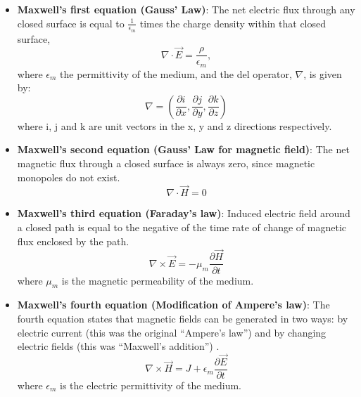 \documentclass[../report.tex]{subfiles}
\begin{document}
\begin{itemize}	
	\item \textbf{Maxwell's first equation (Gauss' Law)}: The net electric flux through any closed surface is equal to $\frac{1}{\epsilon_m}$ times the charge density within that closed surface,
	\begin{equation}\label{eq:max1_1}
	\nabla \cdot \vec{E} = \frac{\rho}{\epsilon_m},	
	\end{equation}
	where $\epsilon_m$ the permittivity of the medium, and the del operator, $\nabla$, is given by:
	\begin{equation}\label{eq:max1_2}
	\nabla = \left(\frac{\partial i}{\partial x},\frac{\partial j}{\partial y},\frac{\partial k}{\partial z}\right)
	\end{equation}
	where i, j and k are unit vectors in the x, y and z directions respectively.
	
	\item \textbf{Maxwell's second equation (Gauss' Law for magnetic field)}: The net magnetic flux through a closed surface is always zero, since magnetic monopoles do not exist.
	\begin{equation}\label{eq:max1_3}
	\nabla \cdot \vec{H}= 0	
	\end{equation}
	
	\item \textbf{Maxwell's third equation (Faraday's law)}: Induced electric field around a closed path is equal to the negative of the time rate of change of magnetic flux enclosed by the path.
	\begin{equation}\label{eq:max1_4}
	\nabla\times \vec{E} = -\mu_m\frac{\partial \vec{H}}{\partial t}
	\end{equation}
	where $\mu_m$ is the magnetic permeability of the medium.

	\item \textbf{Maxwell's fourth equation (Modification of Ampere's law)}:  The fourth equation states that magnetic fields can be generated in two ways: by electric current (this was the original “Ampere's law”) and by changing electric fields (this was “Maxwell's addition”) \cite{wiki_maxwells_2016}.
	\begin{equation}\label{eq:max1_5}
	\nabla\times \vec{H} =  J + \epsilon_m\frac{\partial \vec{E}}{\partial t}	
	\end{equation}
	where $\epsilon_m$ is the electric permittivity of the medium.	
\end{itemize}
\end{document}
